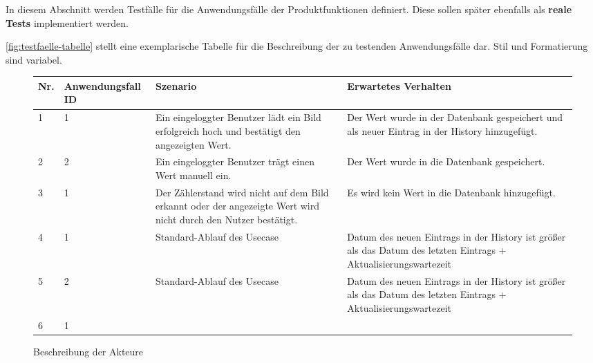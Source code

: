\begin{tcolorbox}
	In diesem Abschnitt werden Testfälle für die Anwendungsfälle der Produktfunktionen definiert.
	Diese sollen später ebenfalls als \textbf{reale Tests} implementiert werden.
	
	\autoref{fig:testfaelle-tabelle} stellt eine exemplarische Tabelle für die Beschreibung der zu testenden Anwendungsfälle dar. 
	Stil und Formatierung sind variabel.
	\end{tcolorbox}
	
	\begin{figure}[!h]
		\begin{center}
			\begin{tabularx}{\textwidth}{ p{} | p{} | p{} | X }
				\textbf{Nr.} & \textbf{Anwendungsfall ID} & \textbf{Szenario} & \textbf{Erwartetes Verhalten} \\ \hline
				1 & 1 & Ein eingeloggter Benutzer lädt ein Bild erfolgreich hoch und bestätigt den angezeigten Wert. & Der Wert wurde in der Datenbank gespeichert und als neuer Eintrag in der History hinzugefügt.    \\ \hline
				2 & 2 & Ein eingeloggter Benutzer trägt einen Wert manuell ein. & Der Wert wurde in die Datenbank gespeichert. \\ \hline
				3 & 1 & Der Zählerstand wird nicht auf dem Bild erkannt oder der angezeigte Wert wird nicht durch den Nutzer bestätigt. & Es wird kein Wert in die Datenbank hinzugefügt. \\ \hline
				4 & 1 & Standard-Ablauf des Usecase  & Datum des neuen Eintrags in der History ist größer als das Datum des letzten Eintrags + Aktualisierungswartezeit \\ \hline
				5 & 2 & Standard-Ablauf des Usecase  & Datum des neuen Eintrags in der History ist größer als das Datum des letzten Eintrags + Aktualisierungswartezeit \\ \hline
				6 & 1 &  &  \\ \hline
			\end{tabularx}	
		\end{center}
		\caption{Beschreibung der Akteure}
		\label{fig:testfaelle-tabelle}
	\end{figure}
	